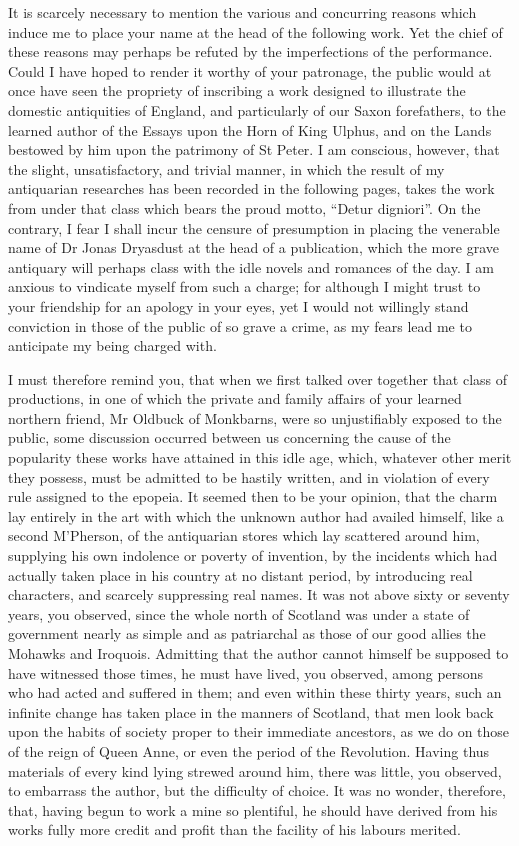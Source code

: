 It is scarcely necessary to mention the various and concurring reasons
which induce me to place your name at the head of the following work.
Yet the chief of these reasons may perhaps be refuted by the
imperfections of the performance. Could I have hoped to render it worthy
of your patronage, the public would at once have seen the propriety of
inscribing a work designed to illustrate the domestic antiquities of
England, and particularly of our Saxon forefathers, to the learned
author of the Essays upon the Horn of King Ulphus, and on the Lands
bestowed by him upon the patrimony of St Peter. I am conscious, however,
that the slight, unsatisfactory, and trivial manner, in which the result
of my antiquarian researches has been recorded in the following pages,
takes the work from under that class which bears the proud motto,
``Detur digniori''. On the contrary, I fear I shall incur the censure of
presumption in placing the venerable name of Dr Jonas Dryasdust at the
head of a publication, which the more grave antiquary will perhaps class
with the idle novels and romances of the day. I am anxious to vindicate
myself from such a charge; for although I might trust to your friendship
for an apology in your eyes, yet I would not willingly stand conviction
in those of the public of so grave a crime, as my fears lead me to
anticipate my being charged with.

I must therefore remind you, that when we first talked over together
that class of productions, in one of which the private and family
affairs of your learned northern friend, Mr Oldbuck of Monkbarns, were
so unjustifiably exposed to the public, some discussion occurred between
us concerning the cause of the popularity these works have attained in
this idle age, which, whatever other merit they possess, must be
admitted to be hastily written, and in violation of every rule assigned
to the epopeia. It seemed then to be your opinion, that the charm lay
entirely in the art with which the unknown author had availed himself,
like a second M'Pherson, of the antiquarian stores which lay scattered
around him, supplying his own indolence or poverty of invention, by the
incidents which had actually taken place in his country at no distant
period, by introducing real characters, and scarcely suppressing real
names. It was not above sixty or seventy years, you observed, since the
whole north of Scotland was under a state of government nearly as simple
and as patriarchal as those of our good allies the Mohawks and Iroquois.
Admitting that the author cannot himself be supposed to have witnessed
those times, he must have lived, you observed, among persons who had
acted and suffered in them; and even within these thirty years, such an
infinite change has taken place in the manners of Scotland, that men
look back upon the habits of society proper to their immediate
ancestors, as we do on those of the reign of Queen Anne, or even the
period of the Revolution. Having thus materials of every kind lying
strewed around him, there was little, you observed, to embarrass the
author, but the difficulty of choice. It was no wonder, therefore, that,
having begun to work a mine so plentiful, he should have derived from
his works fully more credit and profit than the facility of his labours
merited.


